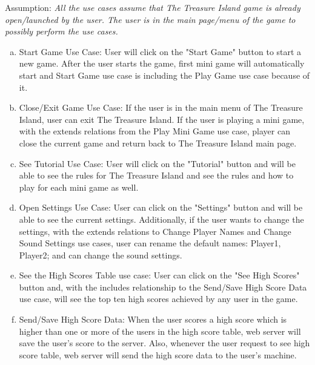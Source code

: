 \documentclass[]{article}
\begin{document}
Assumption: \textit{All the use cases assume that The Treasure Island game is already open/launched by the user. The user is in the main page/menu of the game to possibly perform the use cases.}

\begin{enumerate}[a)]
    \item Start Game Use Case: User will click on the "Start Game" button to start a new game. After the user starts the game, first mini game will automatically start and Start Game use case is including the Play Game use case because of it.
    \item Close/Exit Game Use Case: If the user is in the main menu of The Treasure Island, user can exit The Treasure Island. If the user is playing a mini game, with the extends relations from the Play Mini Game use case, player can close the current game and return back to The Treasure Island main page.
    \item See Tutorial Use Case: User will click on the "Tutorial" button and will be able to see the rules for The Treasure Island and see the rules and how to play for each mini game as well.
    \item Open Settings Use Case: User can click on the "Settings" button and will be able to see the current settings. Additionally, if the user wants to change the settings, with the extends relations to Change Player Names and Change Sound Settings use cases, user can rename the default names: Player1, Player2; and can change the sound settings.
    \item See the High Scores Table use case: User can click on the "See High Scores" button and, with the includes relationship to the Send/Save High Score Data use case, will see the top ten high scores achieved by any user in the game.
    \item Send/Save High Score Data: When the user scores a high score which is higher than one or more of the users in the high score table, web server will save the user's score to the server. Also, whenever the user request to see high score table, web server will send the high score data to the user's machine.
\end{enumerate}



\end{document}
